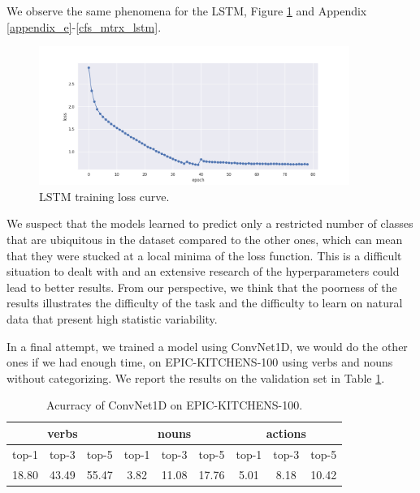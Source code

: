 \documentclass[12pt, a4paper]{report}
\begin{document}
			We observe the same phenomena for the LSTM, Figure \ref{lstm_curve} and Appendix \ref{appendix_e}-\ref{cfs_mtrx_lstm}.
			\begin{figure}[h!]
				\centering
				\includegraphics[width=0.9\textwidth]{curve_lstm.png}
				\caption{LSTM training loss curve.}
				\label{lstm_curve}
			\end{figure}
			We suspect that the models learned to predict only a restricted number of classes that are ubiquitous in the dataset compared to the other ones, which can mean that they were stucked at a local minima of the loss function.
			This is a difficult situation to dealt with and an extensive research of the hyperparameters could lead to better results.
			From our perspective, we think that the poorness of the results illustrates the difficulty of the task and the difficulty to learn on natural data that present high statistic variability.
			\par
			In a final attempt, we trained a model using ConvNet1D, we would do the other ones if we had enough time, on EPIC-KITCHENS-100 using verbs and nouns without categorizing.
			We report the results on the validation set in Table \ref{convnet_accuracy}.
			\begin{table}[h!]
				\centering
				\begin{tabular}{| c | c | c | c | c | c | c | c | c |}
					\hline
					\multicolumn{3}{|c|}{verbs} & \multicolumn{3}{|c|}{nouns} & \multicolumn{3}{|c|}{actions} \\
					\hline
					top-1 & top-3 & top-5 & top-1 & top-3 & top-5 & top-1 & top-3 & top-5 \\
					\hline
					18.80 & 43.49 & 55.47 & 3.82 & 11.08 & 17.76 & 5.01 & 8.18 & 10.42 \\
					\hline
				\end{tabular}
				\caption{Acurracy of ConvNet1D on EPIC-KITCHENS-100.}
				\label{convnet_accuracy}
			\end{table}
\end{document}
